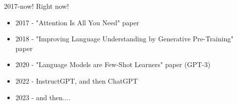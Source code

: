 \documentclass{beamer}
\begin{document}

\begin{frame}{2017-now! Right now!}
	\begin{itemize}
		\item 2017 - "Attention Is All You Need" paper
		\pause
		\item 2018 - "Improving Language Understanding by Generative Pre-Training" paper
		\pause 
		\item 2020 - "Language Models are Few-Shot Learners" paper (GPT-3)
		\pause
		\item 2022 - InstructGPT, and then ChatGPT
		\pause
		\item 2023 - and then....
	\end{itemize}
\end{frame}

\begin{frame}[plain]
\end{frame}



\end{document}
